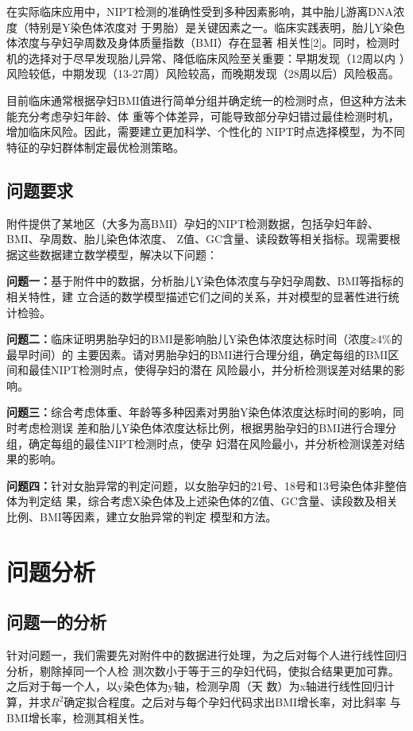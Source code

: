 \documentclass{article}
\begin{document}
在实际临床应用中，NIPT检测的准确性受到多种因素影响，其中胎儿游离DNA浓度（特别是Y染色体浓度对
于男胎）是关键因素之一。临床实践表明，胎儿Y染色体浓度与孕妇孕周数及身体质量指数（BMI）存在显著
相关性[2]。同时，检测时机的选择对于尽早发现胎儿异常、降低临床风险至关重要：早期发现（12周以内
）风险较低，中期发现（13-27周）风险较高，而晚期发现（28周以后）风险极高。

目前临床通常根据孕妇BMI值进行简单分组并确定统一的检测时点，但这种方法未能充分考虑孕妇年龄、体
重等个体差异，可能导致部分孕妇错过最佳检测时机，增加临床风险。因此，需要建立更加科学、个性化的
NIPT时点选择模型，为不同特征的孕妇群体制定最优检测策略。

\subsection{\textbf{问题要求}}
附件提供了某地区（大多为高BMI）孕妇的NIPT检测数据，包括孕妇年龄、BMI、孕周数、胎儿染色体浓度、
Z值、GC含量、读段数等相关指标。现需要根据这些数据建立数学模型，解决以下问题：

\textbf{问题一：}基于附件中的数据，分析胎儿Y染色体浓度与孕妇孕周数、BMI等指标的相关特性，建
立合适的数学模型描述它们之间的关系，并对模型的显著性进行统计检验。

\textbf{问题二：}临床证明男胎孕妇的BMI是影响胎儿Y染色体浓度达标时间（浓度≥4\%的最早时间）的
主要因素。请对男胎孕妇的BMI进行合理分组，确定每组的BMI区间和最佳NIPT检测时点，使得孕妇的潜在
风险最小，并分析检测误差对结果的影响。

\textbf{问题三：}综合考虑体重、年龄等多种因素对男胎Y染色体浓度达标时间的影响，同时考虑检测误
差和胎儿Y染色体浓度达标比例，根据男胎孕妇的BMI进行合理分组，确定每组的最佳NIPT检测时点，使孕
妇潜在风险最小，并分析检测误差对结果的影响。

\textbf{问题四：}针对女胎异常的判定问题，以女胎孕妇的21号、18号和13号染色体非整倍体为判定结
果，综合考虑X染色体及上述染色体的Z值、GC含量、读段数及相关比例、BMI等因素，建立女胎异常的判定
模型和方法。

\section{\textbf{问题分析}}
\subsection{\textbf{问题一的分析}}
针对问题一，我们需要先对附件中的数据进行处理，为之后对每个人进行线性回归分析，剔除掉同一个人检
测次数小于等于三的孕妇代码，使拟合结果更加可靠。之后对于每一个人，以y染色体为y轴，检测孕周（天
数）为x轴进行线性回归计算，并求$R^2$确定拟合程度。之后对与每个孕妇代码求出BMI增长率，对比斜率
与BMI增长率，检测其相关性。
\end{document}
